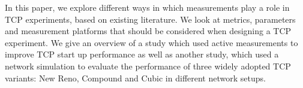 In this paper, we explore different ways in which measurements play a role in TCP experiments, based on existing literature. We look at metrics, parameters and measurement platforms that should be considered when designing a TCP experiment. We give an overview of a study which used active measurements to improve TCP start up performance as well as another study, which used a network simulation to evaluate the performance of three widely adopted TCP variants: New Reno, Compound and Cubic in different network setups.